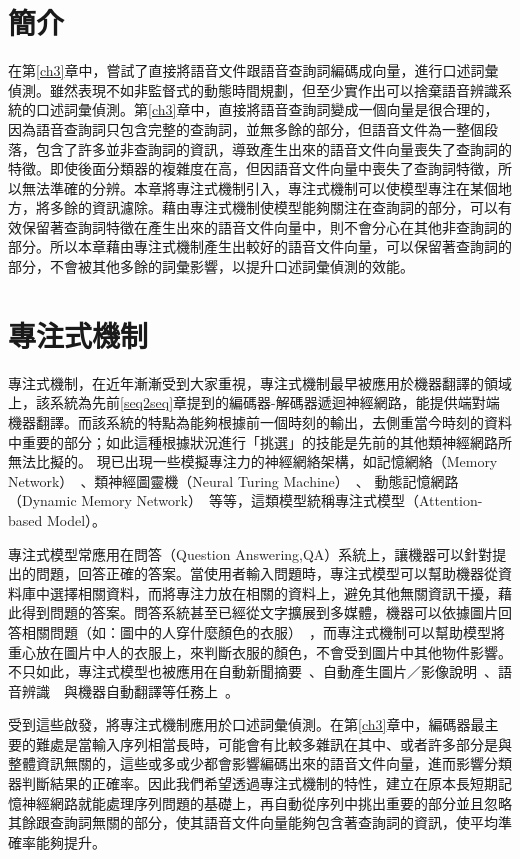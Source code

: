 \section{簡介}
在第\ref{ch3}章中，嘗試了直接將語音文件跟語音查詢詞編碼成向量，進行口述詞彙偵測。雖然表現不如非監督式的動態時間規劃，但至少實作出可以捨棄語音辨識系統的口述詞彙偵測。第\ref{ch3}章中，直接將語音查詢詞變成一個向量是很合理的，因為語音查詢詞只包含完整的查詢詞，並無多餘的部分，但語音文件為一整個段落，包含了許多並非查詢詞的資訊，導致產生出來的語音文件向量喪失了查詢詞的特徵。即使後面分類器的複雜度在高，但因語音文件向量中喪失了查詢詞特徵，所以無法準確的分辨。本章將專注式機制引入，專注式機制可以使模型專注在某個地方，將多餘的資訊濾除。藉由專注式機制使模型能夠關注在查詢詞的部分，可以有效保留著查詢詞特徵在產生出來的語音文件向量中，則不會分心在其他非查詢詞的部分。所以本章藉由專注式機制產生出較好的語音文件向量，可以保留著查詢詞的部分，不會被其他多餘的詞彙影響，以提升口述詞彙偵測的效能。
\section{專注式機制}
專注式機制，在近年漸漸受到大家重視，專注式機制最早被應用於機器翻譯的領域上，該系統為先前\ref{seq2seq}章提到的編碼器-解碼器遞迴神經網路，能提供端對端機器翻譯。而該系統的特點為能夠根據前一個時刻的輸出，去側重當今時刻的資料中重要的部分；如此這種根據狀況進行「挑選」的技能是先前的其他類神經網路所無法比擬的。
現已出現一些模擬專注力的神經網絡架構，如記憶網絡（Memory
Network）~\cite{sukhbaatar2015end}、類神經圖靈機（Neural Turing
Machine）~\cite{graves2014neural}、 動態記憶網路（Dynamic
Memory
Network）~\cite{kumar2015ask}等等，這類模型統稱專注式模型（Attention-based
Model）。

專注式模型常應用在問答（Question
Answering,QA）系統上，讓機器可以針對提出的問題，回答正確的答案。當使用者輸入問題時，專注式模型可以幫助機器從資料庫中選擇相關資料，而將專注力放在相關的資料上，避免其他無關資訊干擾，藉此得到問題的答案。問答系統甚至已經從文字擴展到多媒體，機器可以依據圖片回答相關問題（如：圖中的人穿什麼顏色的衣服）~\cite{agrawal2015vqa}，而專注式機制可以幫助模型將重心放在圖片中人的衣服上，來判斷衣服的顏色，不會受到圖片中其他物件影響。不只如此，專注式模型也被應用在自動新聞摘要~\cite{rush2015neural}、自動產生圖片／影像說明~\cite{xu2015show}、語音辨識~\cite{chan2016listen}~與機器自動翻譯等任務上~\cite{bahdanau2014neural}。

受到這些啟發，將專注式機制應用於口述詞彙偵測。在第\ref{ch3}章中，編碼器最主要的難處是當輸入序列相當長時，可能會有比較多雜訊在其中、或者許多部分是與整體資訊無關的，這些或多或少都會影響編碼出來的語音文件向量，進而影響分類器判斷結果的正確率。因此我們希望透過專注式機制的特性，建立在原本長短期記憶神經網路就能處理序列問題的基礎上，再自動從序列中挑出重要的部分並且忽略其餘跟查詢詞無關的部分，使其語音文件向量能夠包含著查詢詞的資訊，使平均準確率能夠提升。
